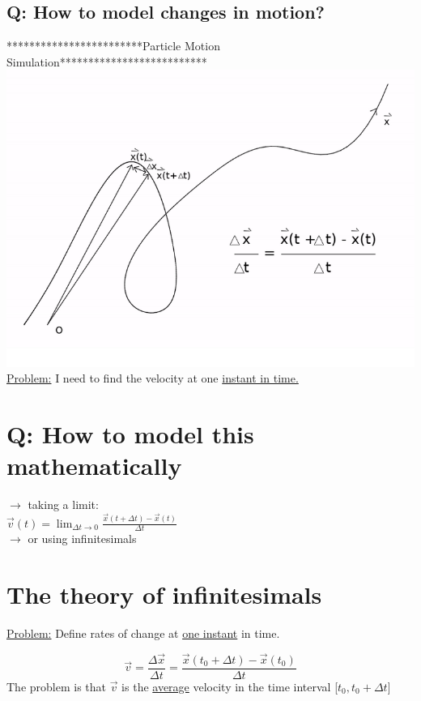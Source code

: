 \documentclass[a4paper, 12pt]{article}
\begin{document}
\subsection{Q: How to model changes in motion?}
************************Particle Motion Simulation**************************\\
\includegraphics[scale=0.7]{Particle Motion Simulation}\\
\underline{Problem:} I need to find the velocity at one \underline{instant in time.}

\section{Q: How to model this mathematically}
$\rightarrow$ taking a limit:\\
$\vec{v}(t) = \displaystyle\lim_{\Delta t\to 0} \frac{\vec{x}(t+\Delta t) - \vec{x}(t)}{\Delta t}$\\
$\rightarrow$ or using infinitesimals

\section{The theory of infinitesimals}
\underline{Problem:} Define rates of change at \underline{one instant} in time.\\
\begin{center}
\end{center}
$$\vec{v} = \frac{\Delta \vec{x}}{\Delta t} = \frac{\vec{x}(t_0+\Delta t)-\vec{x}(t_0)}{\Delta t}$$
The problem is that $\vec{v}$ is the \underline{average} velocity in the time interval [$t_0,t_0+\Delta t$]\\
\end{document}
